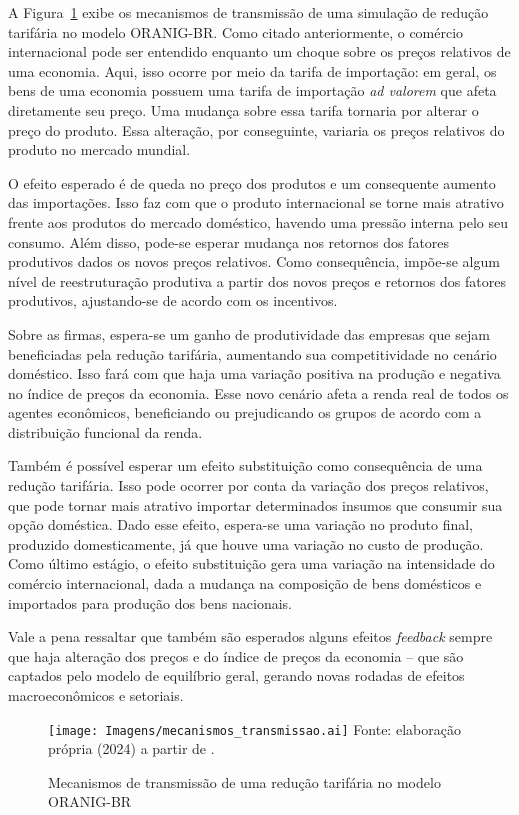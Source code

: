 A Figura~\ref{fig:mecanismos} exibe os mecanismos de transmissão de uma simulação de redução tarifária no modelo ORANIG-BR. Como citado anteriormente, o comércio internacional pode ser entendido enquanto um choque sobre os preços relativos de uma economia. Aqui, isso ocorre por meio da tarifa de importação: em geral, os bens de uma economia possuem uma tarifa de importação \textit{ad valorem} que afeta diretamente seu preço. Uma mudança sobre essa tarifa tornaria por alterar o preço do produto. Essa alteração, por conseguinte, variaria os preços relativos do produto no mercado mundial.

O efeito esperado é de queda no preço dos produtos e um consequente aumento das importações. Isso faz com que o produto internacional se torne mais atrativo frente aos produtos do mercado doméstico, havendo uma pressão interna pelo seu consumo. Além disso, pode-se esperar mudança nos retornos dos fatores produtivos dados os novos preços relativos. Como consequência, impõe-se algum nível de reestruturação produtiva a partir dos novos preços e retornos dos fatores produtivos, ajustando-se de acordo com os incentivos.

Sobre as firmas, espera-se um ganho de produtividade das empresas que sejam beneficiadas pela redução tarifária, aumentando sua competitividade no cenário doméstico. Isso fará com que haja uma variação positiva na produção e negativa no índice de preços da economia. Esse novo cenário afeta a renda real de todos os agentes econômicos, beneficiando ou prejudicando os grupos de acordo com a distribuição funcional da renda.

Também é possível esperar um efeito substituição como consequência de uma redução tarifária. Isso pode ocorrer por conta da variação dos preços relativos, que pode tornar mais atrativo importar determinados insumos que consumir sua opção doméstica. Dado esse efeito, espera-se uma variação no produto final, produzido domesticamente, já que houve uma variação no custo de produção. Como último estágio, o efeito substituição gera uma variação na intensidade do comércio internacional, dada a mudança na composição de bens domésticos e importados para produção dos bens nacionais.

Vale a pena ressaltar que também são esperados alguns efeitos \textit{feedback} sempre que haja alteração dos preços e do índice de preços da economia -- que são captados pelo modelo de equilíbrio geral, gerando novas rodadas de efeitos macroeconômicos e setoriais.


\begin{figure}[H]
	\centering
	\caption{Mecanismos de transmissão de uma redução tarifária no modelo ORANIG-BR} \label{fig:mecanismos}
	\texttt{[image: Imagens/mecanismos\_transmissao.ai]}
	\footnotesize
	Fonte: elaboração própria (2024) a partir de \textcite{vinicius18}.
\end{figure}



